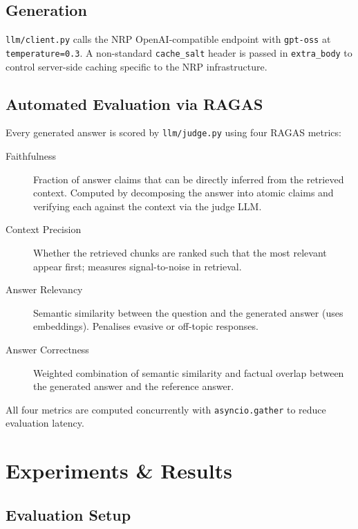 \documentclass[11pt,a4paper]{article}
\begin{document}
\subsection{Generation}

\texttt{llm/client.py} calls the NRP OpenAI-compatible endpoint with
\texttt{gpt-oss} at \texttt{temperature=0.3}.  A non-standard
\texttt{cache\_salt} header is passed in \texttt{extra\_body} to control
server-side caching specific to the NRP infrastructure.

\subsection{Automated Evaluation via RAGAS}

Every generated answer is scored by \texttt{llm/judge.py} using four RAGAS
metrics:

\begin{description}
    \item[Faithfulness] Fraction of answer claims that can be directly inferred
          from the retrieved context.  Computed by decomposing the answer into
          atomic claims and verifying each against the context via the judge LLM.
    \item[Context Precision] Whether the retrieved chunks are ranked such that the
          most relevant appear first; measures signal-to-noise in retrieval.
    \item[Answer Relevancy] Semantic similarity between the question and the
          generated answer (uses embeddings).  Penalises evasive or off-topic
          responses.
    \item[Answer Correctness] Weighted combination of semantic similarity and
          factual overlap between the generated answer and the reference answer.
\end{description}

All four metrics are computed concurrently with \texttt{asyncio.gather} to
reduce evaluation latency.

\section{Experiments \& Results}

\subsection{Evaluation Setup}
\end{document}
